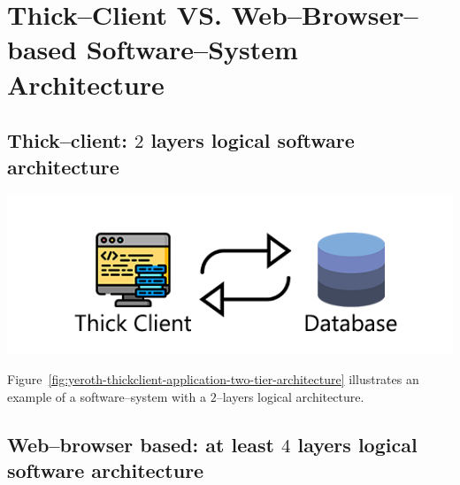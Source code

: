 \chapter{Thick--Client VS. Web--Browser--based Software--System Architecture}

\vspace{-1em}


\vspace{1em}

\section{Thick--client: $2$ layers logical software architecture}

\begin{center}
\includegraphics[scale=0.52]{images/yeroth-thickclient-application-two-tier-architecture.png}
\label{fig:yeroth-thickclient-application-two-tier-architecture}
\end{center}

Figure~\ref{fig:yeroth-thickclient-application-two-tier-architecture}
illustrates an example of a \thickclient
software--system with a $2$--layers
logical architecture.


\section{Web--browser based: at least $4$ layers logical software architecture}


